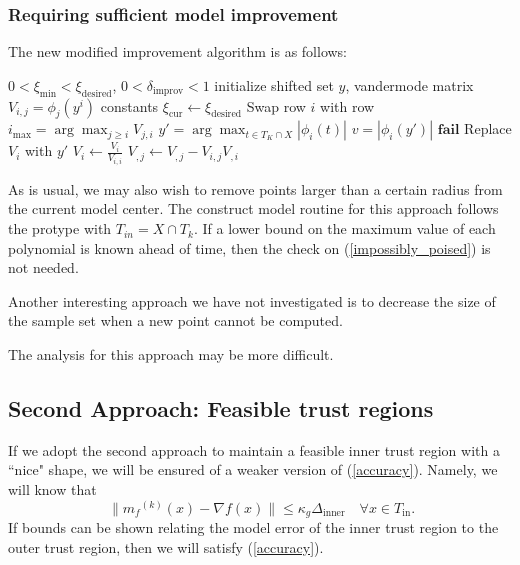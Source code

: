 \documentclass{article}
\theoremstyle{case}
\newcommand{\modelk}{{{m}_f}^{(k)}}
\let\oldref\ref
\renewcommand{\ref}[1]{(\oldref{#1})}
\begin{document}
\subsubsection{Requiring sufficient model improvement}

The new modified improvement algorithm is as follows:

\begin{algorithmic}[1]
\State $0 < \xi_{\text{min}} < \xi_{\text{desired}}$, $0 <\delta_{\text{improv}} < 1$
\State initialize shifted set $y$, vandermode matrix $V_{i,j} = \phi_j(y^i)$ constants
\State $\xi_{\text{cur}} \gets \xi_{\text{desired}}$
    \State Swap row $i$ with row $i_{\max} = \arg \max_{j\ge i} V_{j,i} $
        \State $y' = \arg\max_{t \in T_K \cap X} |\phi_i(t)|$
        \State $v = |\phi_i(y')|$
            \State $\mathbf {fail}$
        \EndIf
            \State Replace $V_i$ with $y'$
        \EndIf
    \EndIf
    \State $V_i \gets \frac{V_i}{V_{i,i}} $
        \State $V_{,j} \gets V_{, j} - V_{i,j} V_{, i}$
    \EndFor
\EndFor
\end{algorithmic}

As is usual, we may also wish to remove points larger than a certain radius from the current model center.
The construct model routine for this approach follows the protype with $T_{in} = X \cap  T_k$.
If a lower bound on the maximum value of each polynomial is known ahead of time, then the check on \ref{impossibly_poised} is not needed.

Another interesting approach we have not investigated is to decrease the size of the sample set when a new point cannot be computed.


The analysis for this approach may be more difficult.




\subsection{Second Approach: Feasible trust regions}

If we adopt the second approach to maintain a feasible inner trust region with a ``nice" shape, we will be ensured of a weaker version of \ref{accuracy}.
Namely, we will know that 
\[\
    \|\modelk(x) - \nabla f(x) \| \le \kappa_g \Delta_{\text{inner}} \quad \forall x \in T_{\text{in}}.
\]
If bounds can be shown relating the model error of the inner trust region to the outer trust region, then we will satisfy \ref{accuracy}.
\end{document}
